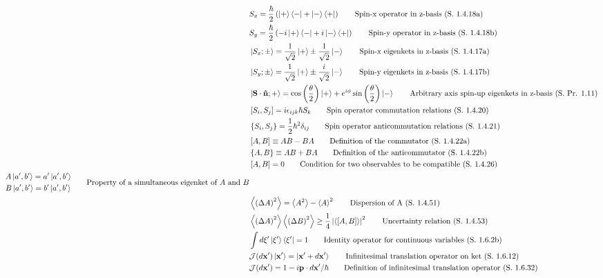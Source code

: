 \documentclass[10pt]{article}
\newcommand{\nhat}{\boldsymbol{\hat{\textbf{n}}}}
\newcommand{\ve}[1]{\boldsymbol{\mathbf{#1}}}
\newcommand{\lrp}[1]{\left( #1 \right)}
\newcommand{\lrb}[1]{\left[ #1 \right]}
\newcommand{\lrc}[1]{\left\{ #1 \right\}}
\begin{document}
\begin{multicols}{2}
\begin{align*}
		& S_x = \frac{\hbar}{2} \lrp{\ket{+} \bra{-} + \ket{-} \bra{+}}		\tag*{Spin-x operator in z-basis (S. 1.4.18a)} \\
		& S_y = \frac{\hbar}{2} \lrp{-i\ket{+} \bra{-} + i\ket{-} \bra{+}}	\tag*{Spin-y operator in z-basis (S. 1.4.18b)} \\
		& \ket{S_x;\pm} = \frac{1}{\sqrt{2}} \ket{+} \pm \frac{1}{\sqrt{2}} \ket{-}		\tag*{Spin-x eigenkets in z-basis (S. 1.4.17a)} \\
		& \ket{S_y;\pm} = \frac{1}{\sqrt{2}} \ket{+} \pm \frac{i}{\sqrt{2}} \ket{-}		\tag*{Spin-y eigenkets in z-basis (S. 1.4.17b)} \\
		& \ket{\ve{S} \cdot \nhat ; +} = \cos\lrp{\frac{\theta}{2}} \ket{+} + e^{i\phi} \sin\lrp{\frac{\theta}{2}} \ket{-}	\tag*{Arbitrary axis spin-up eigenkets in z-basis (S. Pr. 1.11)} \\
		& \lrb{S_i, S_j} = i \epsilon_{ijk} \hbar S_k	\tag*{Spin operator commutation relations (S. 1.4.20)} \\
		& \lrc{S_i,S_j} = \frac{1}{2} \hbar^2 \delta_{ij}	\tag*{Spin operator anticommutation relations (S. 1.4.21)} \\
		& \lrb{A,B} \equiv AB-BA	\tag*{Definition of the commutator (S. 1.4.22a)} \\
		& \lrc{A,B} \equiv AB+BA	\tag*{Definition of the anticommutator (S. 1.4.22b)} \\
		& \lrb{A,B} = 0 \tag*{Condition for two observables to be compatible (S. 1.4.26)} \\
		\begin{split}
			& A \ket{a',b'} = a' \ket{a',b'} \\
			& B \ket{a',b'} = b' \ket{a',b'} \\
		\end{split}	\tag*{Property of a simultaneous eigenket of $A$ and $B$} \\
		& \expval{\lrp{\Delta A}^2} = \expval{A^2} - \expval{A}^2		\tag*{Dispersion of A (S. 1.4.51)} \\
		& \expval{\lrp{\Delta A}^2} \expval{\lrp{\Delta B}^2} \geq \frac{1}{4} \left| \expval{\lrb{A,B}} \right|^2		\tag*{Uncertainty relation (S. 1.4.53)} \\
		& \int d \xi' \ket{\xi'} \bra{\xi'} = 1 	\tag*{Identity operator for continuous variables (S. 1.6.2b)} \\
		& \mathcal{J}(d\ve{x}') \ket{\ve{x}'} = \ket{\ve{x}' + d \ve{x}'}	\tag*{Infinitesimal translation operator on ket (S. 1.6.12)} \\
		& \mathcal{J}(d\ve{x}') = 1 - i\ve{p} \cdot d \ve{x}' / \hbar	\tag*{Definition of infinitesimal translation operator (S. 1.6.32)} \\

\end{align*}
\end{multicols}
\end{document}
